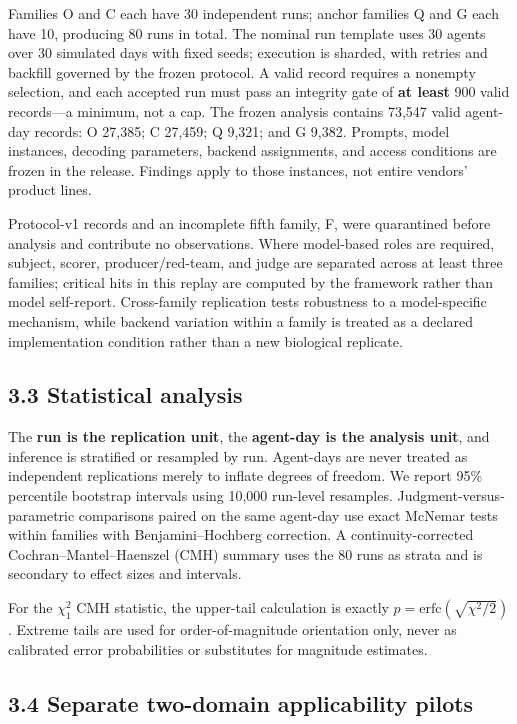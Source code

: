\documentclass[
  conference,10pt]{IEEEtran}
\begin{document}
Families O and C each have 30 independent runs; anchor families Q and G each have 10, producing 80 runs in total. The nominal run template uses 30 agents over 30 simulated days with fixed seeds; execution is sharded, with retries and backfill governed by the frozen protocol. A valid record requires a nonempty selection, and each accepted run must pass an integrity gate of \textbf{at least} 900 valid records---a minimum, not a cap. The frozen analysis contains 73,547 valid agent-day records: O 27,385; C 27,459; Q 9,321; and G 9,382. Prompts, model instances, decoding parameters, backend assignments, and access conditions are frozen in the release. Findings apply to those instances, not entire vendors' product lines.

Protocol-v1 records and an incomplete fifth family, F, were quarantined before analysis and contribute no observations. Where model-based roles are required, subject, scorer, producer/red-team, and judge are separated across at least three families; critical hits in this replay are computed by the framework rather than model self-report. Cross-family replication tests robustness to a model-specific mechanism, while backend variation within a family is treated as a declared implementation condition rather than a new biological replicate.

\subsection{3.3 Statistical analysis}\label{statistical-analysis}

The \textbf{run is the replication unit}, the \textbf{agent-day is the analysis unit}, and inference is stratified or resampled by run. Agent-days are never treated as independent replications merely to inflate degrees of freedom. We report 95\% percentile bootstrap intervals using 10,000 run-level resamples. Judgment-versus-parametric comparisons paired on the same agent-day use exact McNemar tests within families with Benjamini--Hochberg correction. A continuity-corrected Cochran--Mantel--Haenszel (CMH) summary uses the 80 runs as strata and is secondary to effect sizes and intervals.

For the \(\chi^2_1\) CMH statistic, the upper-tail calculation is exactly \(p=\mathrm{erfc}(\sqrt{\chi^2/2})\). Extreme tails are used for order-of-magnitude orientation only, never as calibrated error probabilities or substitutes for magnitude estimates.

\subsection{3.4 Separate two-domain applicability pilots}\label{separate-two-domain-applicability-pilots}
\end{document}

